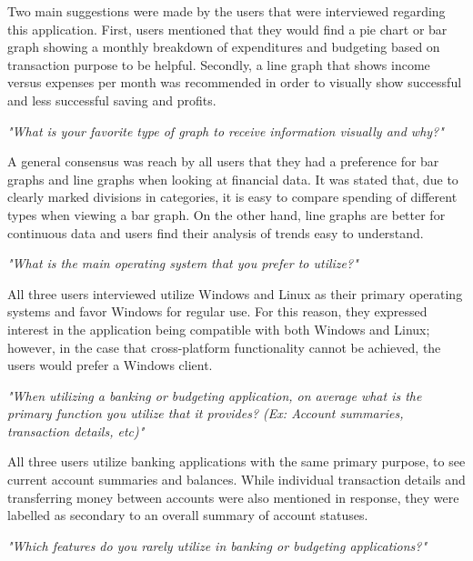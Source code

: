     \bigskip\noindent Two main suggestions were made by the users that were interviewed regarding this application. First, users mentioned that they would find a pie chart or bar graph showing a monthly breakdown of expenditures and budgeting based on transaction purpose to be helpful. Secondly, a line graph that shows income versus expenses per month was recommended in order to visually show successful and less successful saving and profits.

    \bigskip\noindent\textit{"What is your favorite type of graph to receive information visually and why?"}
    
    \bigskip\noindent A general consensus was reach by all users that they had a preference for bar graphs and line graphs when looking at financial data. It was stated that, due to clearly marked divisions in categories, it is easy to compare spending of different types when viewing a bar graph. On the other hand, line graphs are better for continuous data and users find their analysis of trends easy to understand.

    \bigskip \noindent\textit{"What is the main operating system that you prefer to utilize?"}
    
    \bigskip \noindent All three users interviewed utilize Windows and Linux as their primary operating systems and favor Windows for regular use. For this reason, they expressed interest in the application being compatible with both Windows and Linux; however, in the case that cross-platform functionality cannot be achieved, the users would prefer a Windows client.

    \bigskip\noindent\textit{"When utilizing a banking or budgeting application, on average what is the primary function you utilize that it provides? (Ex: Account summaries, transaction details, etc)"}
    
    \bigskip\noindent All three users utilize banking applications with the same primary purpose, to see current account summaries and balances. While individual transaction details and transferring money between accounts were also mentioned in response, they were labelled as secondary to an overall summary of account statuses.

    \bigskip\noindent\textit{"Which features do you rarely utilize in banking or budgeting applications?"}

